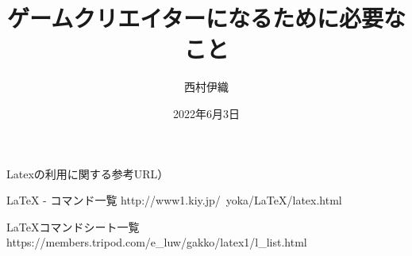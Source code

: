 \documentclass[resume]{hitsotsuron} %
\title{ゲームクリエイターになるために必要なこと}
\author{西村伊織}
\date{2022年6月3日}
\begin{document}

\twocolumn[%
\maketitle
]


Latexの利用に関する参考URL）

LaTeX - コマンド一覧
http://www1.kiy.jp/~yoka/LaTeX/latex.html

LaTeXコマンドシート一覧
https://members.tripod.com/e_luw/gakko/latex1/l_list.html

\fi











\end{document}

